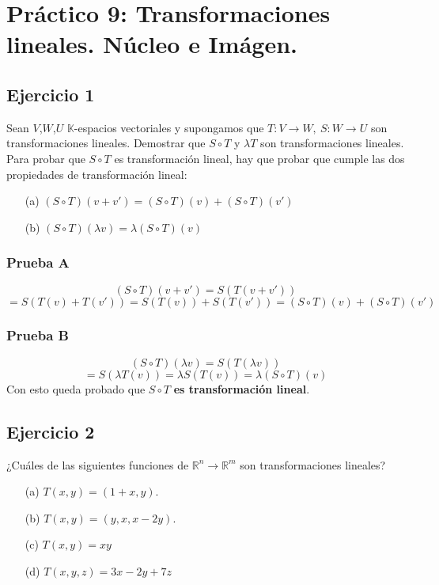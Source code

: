 \documentclass[a4paper,12pt]{article}
\begin{document}
\section{Práctico 9: Transformaciones lineales. Núcleo e Imágen.}
\subsection{Ejercicio 1}
Sean $V$,$W$,$U$ $\mathds{K}$-espacios vectoriales y supongamos que $T:V\rightarrow W, \ S: W \rightarrow U$ son transformaciones lineales. Demostrar que $S\circ T$ y $\lambda T$ son transformaciones lineales. \\
Para probar que $S\circ T$ es transformación lineal, hay que probar que cumple las dos propiedades de transformación lineal:
\begin{itemize}
    \item[(a)] $(S\circ T)(v+v') = (S\circ T)(v)+(S\circ T)(v')$
    \item[(b)] $(S\circ T)(\lambda v) = \lambda (S\circ T)(v)$
\end{itemize}
\subsubsection{Prueba A}
$$
(S\circ T)(v+v') = S(T(v+v'))
$$
$$
= S(T(v)+T(v')) = S(T(v))+S(T(v')) = (S\circ T)(v)+(S\circ T)(v')
$$
\subsubsection{Prueba B}
$$
(S\circ T)(\lambda v) = S(T(\lambda v))
$$
$$
= S(\lambda T(v)) = \lambda S(T(v)) = \lambda (S\circ T)(v)
$$
Con esto queda probado que $S\circ T$ \textbf{es transformación lineal}. \\


\subsection{Ejercicio 2} 
¿Cuáles de las siguientes funciones de $\mathds{R}^n\rightarrow\mathds{R}^m$ son transformaciones lineales?
\begin{itemize}
    \item[(a)] $T(x,y)=(1+x,y)$.
    \item[(b)] $T(x,y)=(y,x,x-2y)$.
    \item[(c)] $T(x,y) = xy$
    \item[(d)] $T(x,y,z)=3x-2y+7z$
\end{itemize}
\end{document}
